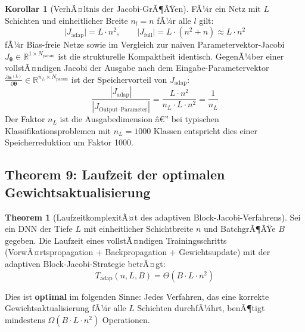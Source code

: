 ﻿\documentclass[a4paper,12pt]{article}
\theoremstyle{definition}
\newtheorem{korollar}{Korollar}
\newtheorem{theorem}{Theorem}
\begin{document}
\begin{korollar}[VerhÃ¤ltnis der Jacobi-GrÃ¶ÃŸen]
	\label{cor:size_ratio}
	FÃ¼r ein Netz mit $L$ Schichten und einheitlicher Breite $n_l = n$ fÃ¼r alle $l$ gilt:
	\[
	\bigl|J_{\mathrm{adap}}\bigr| = L \cdot n^2, \qquad
	\bigl|J_{\mathrm{full}}\bigr| = L \cdot (n^2 + n) \approx L \cdot n^2
	\]
	fÃ¼r Bias-freie Netze sowie im Vergleich zur naiven Parametervektor-Jacobi $J_{\boldsymbol{\theta}} \in \mathbb{R}^{1 \times N_{\mathrm{param}}}$ ist die strukturelle Kompaktheit identisch. GegenÃ¼ber einer vollstÃ¤ndigen Jacobi der Ausgabe nach dem Eingabe-Parametervektor $\frac{\partial \boldsymbol{a}^{(L)}}{\partial \boldsymbol{\theta}} \in \mathbb{R}^{n_L \times N_{\mathrm{param}}}$ ist der Speichervorteil von $J_{\mathrm{adap}}$:
	\[
	\frac{|J_{\mathrm{adap}}|}{|J_{\text{Output--Parameter}}|} = \frac{L \cdot n^2}{n_L \cdot L \cdot n^2} = \frac{1}{n_L}
	\]
	Der Faktor $n_L$ ist die Ausgabedimension â€” bei typischen Klassifikationsproblemen mit $n_L = 1000$ Klassen entspricht dies einer Speicherreduktion um Faktor 1000.
\end{korollar}

\subsection{Theorem 9: Laufzeit der optimalen Gewichtsaktualisierung}

\begin{theorem}[LaufzeitkomplexitÃ¤t des adaptiven Block-Jacobi-Verfahrens]
	\label{thm:runtime}
	Sei ein DNN der Tiefe $L$ mit einheitlicher Schichtbreite $n$ und BatchgrÃ¶ÃŸe $B$ gegeben. Die Laufzeit eines vollstÃ¤ndigen Trainingsschritts (VorwÃ¤rtspropagation + Backpropagation + Gewichtsupdate) mit der adaptiven Block-Jacobi-Strategie betrÃ¤gt:
	\[
	T_{\mathrm{adap}}(n, L, B) = \Theta(B \cdot L \cdot n^2)
	\]
	
	Dies ist \textbf{optimal} im folgenden Sinne: Jedes Verfahren, das eine korrekte Gewichtsaktualisierung fÃ¼r alle $L$ Schichten durchfÃ¼hrt, benÃ¶tigt mindestens $\Omega(B \cdot L \cdot n^2)$ Operationen.
\end{theorem}
\end{document}
